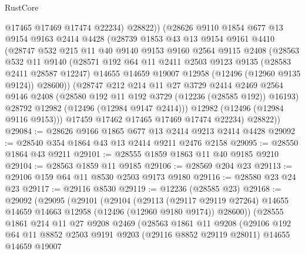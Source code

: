 \begin{lexlean}{RustCore}
\begin{coremodule}
            @17465
            @17469
            @17474
            @22234)
          @28822))
      (@28626
        @9110
        @1854
        @677
        @13
        @9154
        @9163
        @2414
        @4428
        (@28739
          @1853
          @43
          @13
          @9154
          @9161
          @4410
          (@28747
            @532
            @215
            @11
            @40
            @9140
            @9153
            @9160
            @2564
            @9115
            @2408
            (@28563
              @532
              @11
              @9140
              (@28571
                @192
                @64
                @11
                @2411
                @2503
                @9123
                @9135
                (@28583 @2411 @28587 @12247)
                @14655
                @14659
                @19007
                @12958
                (@12496 (@12960 @9135 @9124))
                @28600))
            (@28747
              @212
              @214
              @11
              @27
              @3729
              @2414
              @2469
              @2564
              @9146
              @2408
              (@28580 @192 @11 @192 @3729 (@12236 (@28585 @192)) @16193)
              @28792
              @12982
              (@12496 (@12984 @9147 @2414)))
            @12982
            (@12496 (@12984 @9116 @9153)))
          @17459
          @17462
          @17465
          @17469
          @17474
          @22234)
        @28822))
@29084 := @28626 @9166 @1865 @677 @13 @2414 @9213 @2414 @4428
@29092 := @28540 @354 @1864 @43 @13 @2414 @9211 @2476 @2158
@29095 := @28550 @1864 @43 @9211
@29101 := @28555 @1859 @1863 @11 @40 @9185 @9210
@29104 := @28563 @1859 @11 @9185
@29106 := @28569 @204 @23
@29113 := @29106 @159 @64 @11 @8530 @2503 @9173 @9180
@29116 := @28580 @23 @24 @23
@29117 := @29116 @8530
@29119 := @12236 (@28585 @23)
@29168 := @29092
    (@29095
      (@29101
        (@29104
          (@29113
            (@29117 @29119 @27264)
            @14655
            @14659
            @14663
            @12958
            (@12496 (@12960 @9180 @9174))
            @28600))
        (@28555
          @1861
          @214
          @11
          @27
          @9208
          @2469
          (@28563
            @1861
            @11
            @9208
            (@29106
              @192
              @64
              @11
              @8852
              @2503
              @9191
              @9203
              (@29116 @8852 @29119 @28011)
              @14655
              @14659
              @19007

\end{coremodule}
\end{lexlean}
